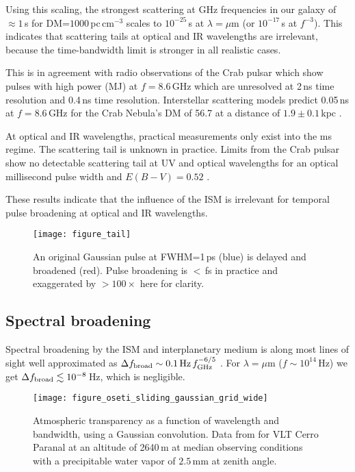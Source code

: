 \documentclass[twocolumn,tighten,longauthor]{myaastex62}
\begin{document}
Using this scaling, the strongest scattering at GHz frequencies in our galaxy of $\approx1\,$s for DM=$1000\,$pc\,cm$^{-3}$ scales to $10^{-25}\,$s at $\lambda=\mu$m (or $10^{-17}\,$s at $f^{-3}$). This indicates that scattering tails at optical and IR wavelengths are irrelevant, because the time-bandwidth limit is stronger in all realistic cases.

This is in agreement with radio observations of the Crab pulsar which show pulses with high power (MJ) at $f=8.6\,$GHz which are unresolved at 2\,ns \citep{2003Natur.422..141H} time resolution and 0.4\,ns time resolution. Interstellar scattering models predict 0.05\,ns at $f=8.6\,$GHz for the Crab Nebula's DM of 56.7 \citep{2007ApJ...670..693H} at a distance of $1.9\pm0.1\,$kpc \citep{1973PASP...85..579T}.

At optical and IR wavelengths, practical measurements only exist into the ms regime. The scattering tail is unknown in practice. Limits from the Crab pulsar show no detectable scattering tail at UV and optical wavelengths for an optical millisecond pulse width and $E(B-V)=0.52$ \citep{2000ApJ...537..861S,Hinton2006,2007Ap&SS.308..595K,Lucarelli2008}.

These results indicate that the influence of the ISM is irrelevant for temporal pulse broadening at optical and IR wavelengths.


\begin{figure}
\texttt{[image: figure\_tail]}
\caption{\label{fig:tail}An original Gaussian pulse at FWHM=1\,ps (blue) is delayed and broadened (red). Pulse broadening is $<\,$fs in practice and exaggerated by $>100\times$ here for clarity.}
\end{figure}


\subsection{Spectral broadening}
\label{sub:spectral_broadening}
Spectral broadening by the ISM and interplanetary medium is along most lines of sight well approximated as $\Delta f_{\rm broad}\sim0.1\,{\rm Hz}\,f^{-6/5}_{\rm GHz}$ \citep{1991ApJ...376..123C,2013ApJ...767...94S,2015aska.confE.116S}. For $\lambda=\mu$m ($f\sim10^{14}\,$Hz) we get $\Delta f_{\rm broad}\lesssim 10^{-8}\,$Hz, which is negligible.


\begin{figure*}
\texttt{[image: figure\_oseti\_sliding\_gaussian\_grid\_wide]}
\caption{\label{fig:oseti_grid}Atmospheric transparency as a function of wavelength and bandwidth, using a Gaussian convolution. Data from \citet{2012A&A...543A..92N,2013A&A...560A..91J} for VLT Cerro Paranal at an altitude of 2640\,m at median observing conditions with a precipitable water vapor of $2.5\,$mm at zenith angle.\\}
\end{figure*}
\end{document}
